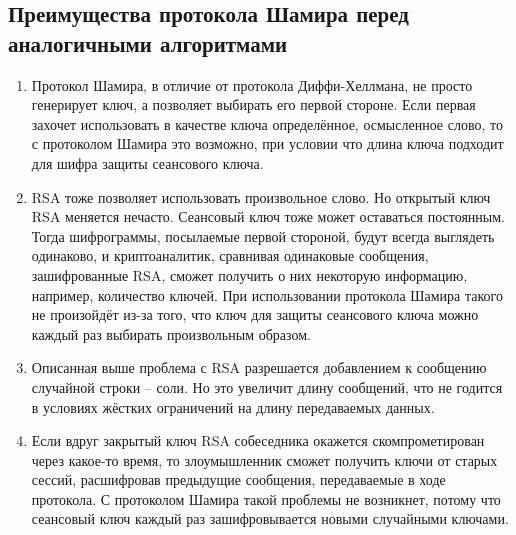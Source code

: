 \subsection{Преимущества протокола Шамира перед аналогичными алгоритмами}
\begin{enumerate}
	\item Протокол Шамира, в отличие от протокола Диффи-Хеллмана, не просто генерирует ключ, а позволяет выбирать его первой стороне. Если первая захочет использовать в качестве ключа определённое, осмысленное слово, то с протоколом Шамира это возможно, при условии что длина ключа подходит для шифра защиты сеансового ключа.
	\item RSA тоже позволяет использовать произвольное слово. Но открытый ключ RSA меняется нечасто. Сеансовый ключ тоже может оставаться постоянным. Тогда шифрограммы, посылаемые первой стороной, будут всегда выглядеть одинаково, и криптоаналитик, сравнивая одинаковые сообщения, зашифрованные RSA, сможет получить о них некоторую информацию, например, количество ключей. При использовании протокола Шамира такого не произойдёт из-за того, что ключ для защиты сеансового ключа можно каждый раз выбирать произвольным образом.
	\item Описанная выше проблема с RSA разрешается добавлением к сообщению случайной строки – соли. Но это увеличит длину сообщений, что не годится в условиях жёстких ограничений на длину передаваемых данных.
	\item Если вдруг закрытый ключ RSA собеседника окажется скомпрометирован через какое-то время, то злоумышленник сможет получить ключи от старых сессий, расшифровав предыдущие сообщения, передаваемые в ходе протокола. С протоколом Шамира такой проблемы не возникнет, потому что сеансовый ключ каждый раз зашифровывается новыми случайными ключами.
\end{enumerate}